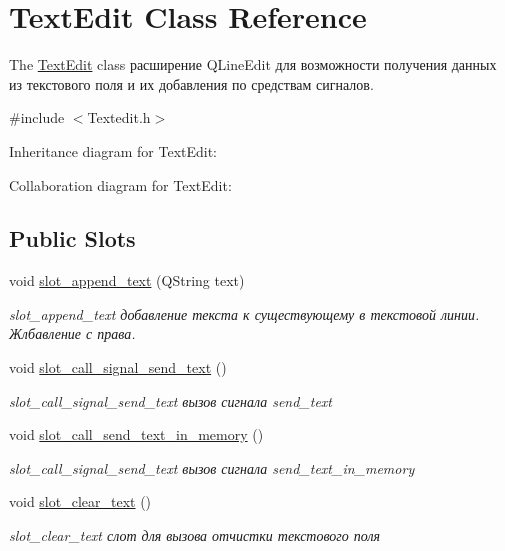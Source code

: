 \hypertarget{classTextEdit}{}\section{Text\+Edit Class Reference}
\label{classTextEdit}


The \hyperlink{classTextEdit}{Text\+Edit} class расширение Q\+Line\+Edit для возможности получения данных из текстового поля и их добавления по средствам сигналов.  




{\ttfamily \#include $<$Textedit.\+h$>$}



Inheritance diagram for Text\+Edit\+:


Collaboration diagram for Text\+Edit\+:
\subsection*{Public Slots}
\begin{DoxyCompactItemize}
\item 
void \hyperlink{classTextEdit_a9871f685d4a3b4b25ac1355d51d3acdf}{slot\+\_\+append\+\_\+text} (Q\+String text)
\begin{DoxyCompactList}\small\item\em slot\+\_\+append\+\_\+text добавление текста к существующему в текстовой линии. Жлбавление с права. \end{DoxyCompactList}\item 
void \hyperlink{classTextEdit_a046965b6b97175794cf24136c1c5dc00}{slot\+\_\+call\+\_\+signal\+\_\+send\+\_\+text} ()
\begin{DoxyCompactList}\small\item\em slot\+\_\+call\+\_\+signal\+\_\+send\+\_\+text вызов сигнала send\+\_\+text \end{DoxyCompactList}\item 
void \hyperlink{classTextEdit_a4251b097753f2403b41da91e9ba5daa4}{slot\+\_\+call\+\_\+send\+\_\+text\+\_\+in\+\_\+memory} ()
\begin{DoxyCompactList}\small\item\em slot\+\_\+call\+\_\+signal\+\_\+send\+\_\+text вызов сигнала send\+\_\+text\+\_\+in\+\_\+memory \end{DoxyCompactList}\item 
void \hyperlink{classTextEdit_af16f1dd8808dd97f52783c614073ae12}{slot\+\_\+clear\+\_\+text} ()
\begin{DoxyCompactList}\small\item\em slot\+\_\+clear\+\_\+text слот для вызова отчистки текстового поля \end{DoxyCompactList}\end{DoxyCompactItemize}
